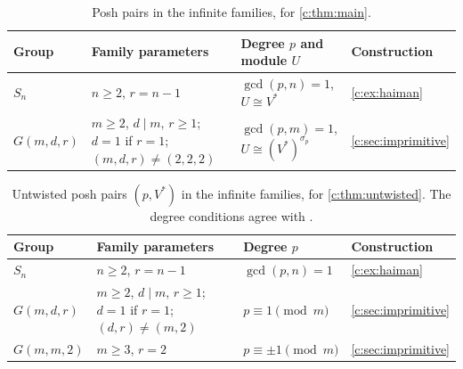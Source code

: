 \documentclass[10pt,a4paper]{amsart}
\theoremstyle{definition}
\begin{document}
\begin{table}[htbp]
\centering
\begin{tabular}{@{}L{.14\textwidth}L{.29\textwidth}L{.30\textwidth}L{.19\textwidth}@{}}
\toprule
Group & Family parameters & Degree $p$ and module $U$ & Construction\\
\midrule
$S_n$ & $n\ge2$, $r=n-1$ & $\gcd(p,n)=1$,\newline $U\cong V^*$ & \cref{c:ex:haiman}\\
\addlinespace
$G(m,d,r)$ & $m\ge2$, $d\mid m$, $r\ge1$;\newline $d=1$ if $r=1$;\newline $(m,d,r)\ne(2,2,2)$ & $\gcd(p,m)=1$,\newline $U\cong(V^*)^{\sigma_p}$ & \cref{c:sec:imprimitive}\\
\bottomrule
\end{tabular}
\caption{Posh pairs in the infinite families, for \cref{c:thm:main}.} %
\label{tab:infinite-algebraic}
\end{table}

\begin{table}[htbp]
\centering
\begin{tabular}{@{}L{.17\textwidth}L{.35\textwidth}L{.20\textwidth}L{.20\textwidth}@{}}
\toprule
Group & Family parameters & Degree $p$ & Construction\\
\midrule
$S_n$ & $n\ge2$, $r=n-1$ & $\gcd(p,n)=1$ & \cref{c:ex:haiman}\\
\addlinespace
$G(m,d,r)$ & $m\ge2$, $d\mid m$, $r\ge1$;\newline $d=1$ if $r=1$;\newline $(d,r)\ne(m,2)$ & $p\equiv1\pmod m$ & \cref{c:sec:imprimitive}\\
\addlinespace
$G(m,m,2)$ & $m\ge3$, $r=2$ & $p\equiv\pm1\pmod m$ & \cref{c:sec:imprimitive}\\
\bottomrule
\end{tabular}
\caption{Untwisted posh pairs $(p,V^*)$ in the infinite
families, for \cref{c:thm:untwisted}. %
The degree conditions agree with \cite[Table 1]{IO}.}
\label{tab:infinite-untwisted}
\end{table}
\end{document}
